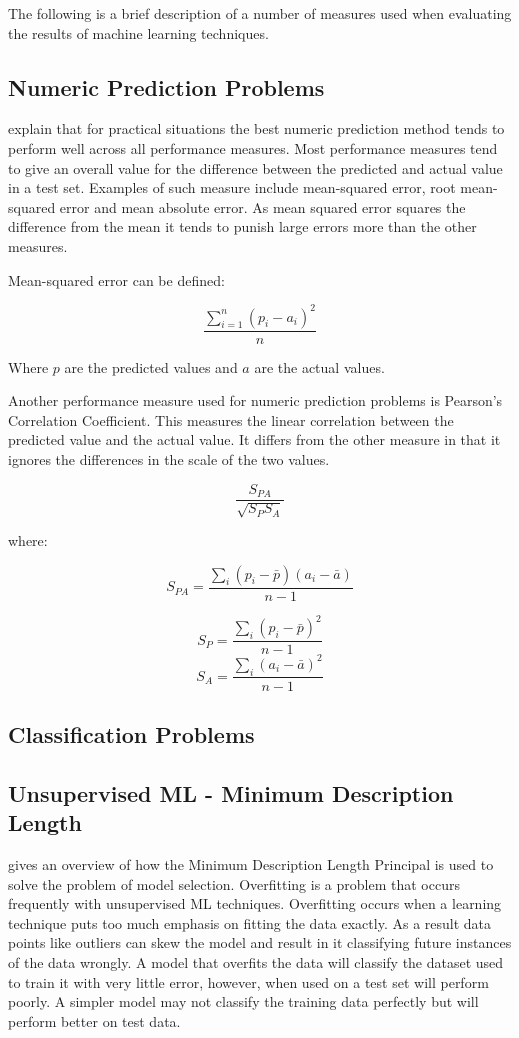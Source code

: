 The following is a brief description of a number of measures used when evaluating the results of machine learning techniques.

\subsection{Numeric Prediction Problems}

\cite{witten2005data} explain that for practical situations the best numeric prediction method tends to perform well across all performance measures. Most performance measures tend to give an overall value for the difference between the predicted and actual value in a test set. Examples of such measure include mean-squared error, root mean-squared error and mean absolute error. As mean squared error squares the difference from the mean it tends to punish large errors more than the other measures.

Mean-squared error can be defined:

$$\frac{\sum \limits_{i=1}^n (p_{i} - a_{i})^2}{n}$$

Where $p$ are the predicted values and $a$ are the actual values.

Another performance measure used for numeric prediction problems is Pearson's Correlation Coefficient. This measures the linear correlation between the predicted value and the actual value. It differs from the other measure in that it ignores the differences in the scale of the two values.

$$\frac{S_{PA}}{\sqrt{S_{P}S_{A}}}$$

where:

$$S_{PA} = \frac{\sum _{i}(p_i - \bar{p})(a_i - \bar{a})}{n - 1}$$

$$S_{P} = \frac{\sum _{i}(p_i - \bar{p})^2}{n - 1}$$
$$S_{A} = \frac{\sum _{i}(a_i - \bar{a})^2}{n - 1}$$


\subsection{Classification Problems}

\subsection{Unsupervised ML - Minimum Description Length}

\cite{grunwald2005tutorial} gives an overview of how the Minimum Description Length Principal is used to solve the problem of model selection. Overfitting is a problem that occurs frequently with unsupervised ML techniques. Overfitting occurs when a learning technique puts too much emphasis on fitting the data exactly. As a result data points like outliers can skew the model and result in it classifying future instances of the data wrongly. A model that overfits the data will classify the dataset used to train it with very little error, however, when used on a test set will perform poorly. A simpler model may not classify the training data perfectly but will perform better on test data.

